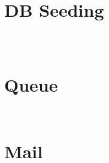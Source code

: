 \begin{lstlisting}[language=PHP]

\end{lstlisting}



\begin{lstlisting}[language=PHP]

\end{lstlisting}

\chapter{DB Seeding}


\begin{lstlisting}[language=PHP]

\end{lstlisting}



\begin{lstlisting}[language=PHP]

\end{lstlisting}



\begin{lstlisting}[language=PHP]

\end{lstlisting}

\chapter{Queue}

\begin{lstlisting}[language=PHP]

\end{lstlisting}




\begin{lstlisting}[language=PHP]

\end{lstlisting}


\chapter{Mail}

\begin{lstlisting}[language=PHP]

\end{lstlisting}




\begin{lstlisting}[language=PHP]

\end{lstlisting}




